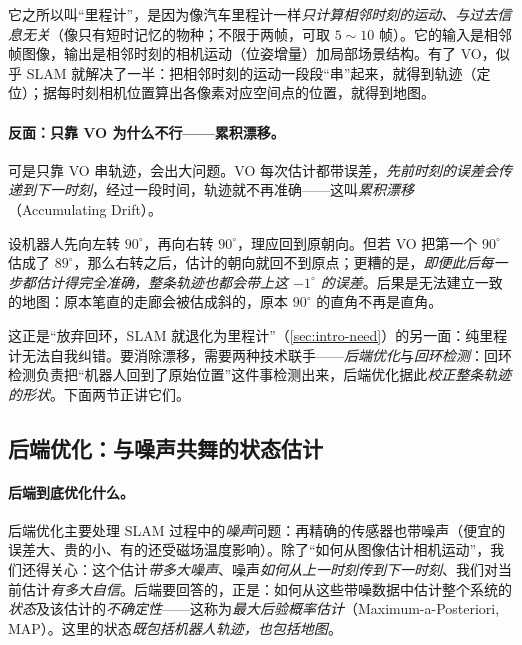 它之所以叫“里程计”，是因为像汽车里程计一样\emph{只计算相邻时刻的运动、与过去信息无关}（像只有短时记忆的物种；不限于两帧，可取 $5\!\sim\!10$ 帧）。它的输入是相邻帧图像，输出是相邻时刻的相机运动（位姿增量）加局部场景结构。有了 VO，似乎 SLAM 就解决了一半：把相邻时刻的运动一段段“串”起来，就得到轨迹（定位）；据每时刻相机位置算出各像素对应空间点的位置，就得到地图。

\paragraph{反面：只靠 VO 为什么不行——累积漂移。}
可是只靠 VO 串轨迹，会出大问题。VO 每次估计都带误差，\emph{先前时刻的误差会传递到下一时刻}，经过一段时间，轨迹就不再准确——这叫\emph{累积漂移}（Accumulating Drift）\cite{gaoxiang2019slam14}。

\begin{example}[累积漂移的一度之差]\label{ex:intro-drift}
设机器人先向左转 $90^\circ$，再向右转 $90^\circ$，理应回到原朝向。但若 VO 把第一个 $90^\circ$ 估成了 $89^\circ$，那么右转之后，估计的朝向就回不到原点；更糟的是，\emph{即便此后每一步都估计得完全准确，整条轨迹也都会带上这 $-1^\circ$ 的误差}。后果是无法建立一致的地图：原本笔直的走廊会被估成斜的，原本 $90^\circ$ 的直角不再是直角。
\end{example}

\noindent 这正是“放弃回环，SLAM 就退化为里程计”（\cref{sec:intro-need}）的另一面：纯里程计无法自我纠错。要消除漂移，需要两种技术联手——\emph{后端优化}与\emph{回环检测}：回环检测负责把“机器人回到了原始位置”这件事检测出来，后端优化据此\emph{校正整条轨迹的形状}。下面两节正讲它们。

\subsection{后端优化：与噪声共舞的状态估计}
\label{sec:intro-backend}
\paragraph{后端到底优化什么。}
后端优化主要处理 SLAM 过程中的\emph{噪声}问题\cite{gaoxiang2019slam14}：再精确的传感器也带噪声（便宜的误差大、贵的小、有的还受磁场温度影响）。除了“如何从图像估计相机运动”，我们还得关心：这个估计\emph{带多大噪声}、噪声\emph{如何从上一时刻传到下一时刻}、我们对当前估计\emph{有多大自信}。后端要回答的，正是：如何从这些带噪数据中估计整个系统的\emph{状态}及该估计的\emph{不确定性}——这称为\emph{最大后验概率估计}（Maximum-a-Posteriori, MAP）。这里的状态\emph{既包括机器人轨迹，也包括地图}。

